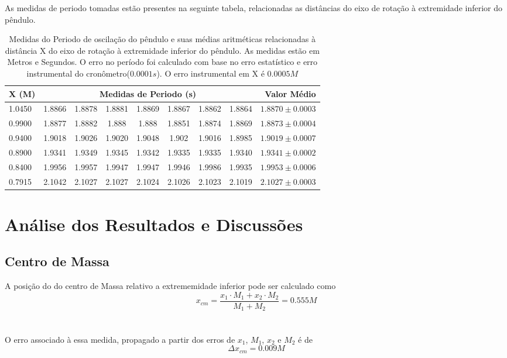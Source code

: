 \documentclass[12pt,a4paper]{article}
\begin{document}
As medidas de periodo tomadas estão presentes na seguinte tabela, relacionadas as distâncias do eixo de rotação à extremidade inferior do pêndulo. \\

\begin{table}[!htbp]
\caption{Medidas do Periodo de oscilação do pêndulo e suas médias aritméticas relacionadas à distância X do eixo de rotação à extremidade inferior do pêndulo. As medidas estão em Metros e Segundos. O erro no período foi calculado com base no erro estatístico e erro instrumental do cronômetro($0.0001 s$). O erro instrumental em X é $0.0005M$}
\def\arraystretch{1.5}
\begin{tabular}{|l| c c c c c c c|r|}
\hline 
X (M) & \multicolumn{7}{c|}{Medidas de Periodo (s)} & Valor Médio \\ 
\hline
1.0450 & 1.8866 & 1.8878 & 1.8881 & 1.8869 & 1.8867 & 1.8862 & 1.8864 & $1.8870 \pm 0.0003 $ \\
\hline
0.9900 & 1.8877 & 1.8882 & 1.888 & 1.888 & 1.8851 & 1.8874 & 1.8869 & $1.8873 \pm 0.0004 $\\
\hline
0.9400 & 1.9018 & 1.9026 & 1.9020 & 1.9048 & 1.902 & 1.9016 & 1.8985 & $1.9019 \pm 0.0007$\\
\hline
0.8900 & 1.9341 & 1.9349 & 1.9345 & 1.9342 & 1.9335 & 1.9335 & 1.9340 & $1.9341 \pm 0.0002$\\
\hline
0.8400 & 1.9956 & 1.9957 & 1.9947 & 1.9947 & 1.9946 & 1.9986 & 1.9935 & $1.9953 \pm 0.0006$\\
\hline
0.7915 & 2.1042 & 2.1027 & 2.1027 & 2.1024 & 2.1026 & 2.1023 & 2.1019 & $2.1027 \pm 0.0003 $\\
\hline
 
\end{tabular}

\end{table}


\newpage

\section{Análise dos Resultados e Discussões}
\subsection{Centro de Massa}
A posição do do centro de Massa relativo a extrememidade inferior pode ser calculado como\\
$$ x_{cm} = \frac{x_1 \cdot M_1 + x_2 \cdot M_2}{M_1 + M_2} = 0.555 M $$\\ \\
O erro associado à essa medida, propagado a partir dos erros de $x_1$, $M_1$, $x_2$ e $M_2$ é de 
$$ \Delta x_{cm} =  0.009 M $$
\end{document}
